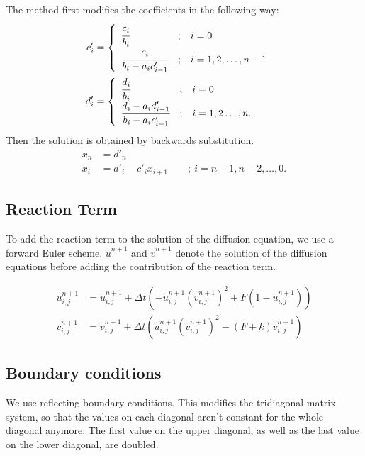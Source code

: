 \documentclass[a4paper]{article}
\begin{document}
The method first modifies the coefficients in the following way:
\begin{align}
	c'_i &=
\begin{cases}
\begin{array}{lcl}
  \cfrac{c_i}{b_i}                  & ; & i = 0 \\
  \cfrac{c_i}{b_i - a_i c'_{i - 1}} & ; & i = 1, 2, \dots, n-1 \\
\end{array}
\end{cases} \\
d'_i &=
\begin{cases}
\begin{array}{lcl}
  \cfrac{d_i}{b_i}                  & ; & i = 0 \\
  \cfrac{d_i - a_i d'_{i - 1}}{b_i - a_i c'_{i - 1}} & ; & i = 1, 2 \dots, n. \\
\end{array}
\end{cases}
\end{align}
Then the solution is obtained by backwards substitution.
\begin{align}
	x_n &= d'_n \\
	x_i &= d'_i - c'_i x_{i + 1} \qquad ; \ i = n - 1, n - 2, \ldots, 0.
\end{align}


\subsection{Reaction Term}
To add the reaction term to the solution of the diffusion equation, we use a forward Euler scheme.
$\tilde u^{n+1}$ and $\tilde v^{n+1}$ denote the solution of the diffusion equations before adding the contribution of the reaction term.

\begin{align}
	u_{i,j}^{n+1} &= \tilde u_{i,j}^{n+1} + \Delta t \left( - \tilde u_{i,j}^{n+1} (\tilde v_{i,j}^{n+1})^2 + F ( 1- \tilde u_{i,j}^{n+1} ) \right) \\
	v_{i,j}^{n+1} &= \tilde v_{i,j}^{n+1} + \Delta t \left( \tilde u_{i,j}^{n+1} (\tilde v_{i,j}^{n+1})^2 - (F+k) \tilde v_{i,j}^{n+1} \right)
\end{align}


\subsection{Boundary conditions}
We use reflecting boundary conditions.
This modifies the tridiagonal matrix system, so that the values on each diagonal aren't constant for the whole diagonal anymore.
The first value on the upper diagonal, as well as the last value on the lower diagonal, are doubled.
\end{document}
